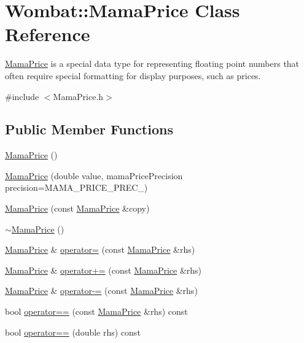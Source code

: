 \hypertarget{classWombat_1_1MamaPrice}{
\section{Wombat::MamaPrice Class Reference}
\label{classWombat_1_1MamaPrice}
}


\hyperlink{classWombat_1_1MamaPrice}{MamaPrice} is a special data type for representing floating point numbers that often require special formatting for display purposes, such as prices.  


{\ttfamily \#include $<$MamaPrice.h$>$}\subsection*{Public Member Functions}
\begin{DoxyCompactItemize}
\item 
\hyperlink{classWombat_1_1MamaPrice_ab210daeb0aac1ceee25ff8b007d6790f}{MamaPrice} ()
\item 
\hyperlink{classWombat_1_1MamaPrice_a85764a87c09a9aeca5bfacb41f834806}{MamaPrice} (double value, mamaPricePrecision precision=MAMA\_\-PRICE\_\-PREC\_)
\item 
\hyperlink{classWombat_1_1MamaPrice_ab355672c720b562a23f51405eeacfe83}{MamaPrice} (const \hyperlink{classWombat_1_1MamaPrice}{MamaPrice} \&copy)
\item 
\hyperlink{classWombat_1_1MamaPrice_a228ecc4b339282a4f0e8ddde42a7bfb1}{$\sim$MamaPrice} ()
\item 
\hyperlink{classWombat_1_1MamaPrice}{MamaPrice} \& \hyperlink{classWombat_1_1MamaPrice_ab330fbbdb0d1a636281767ef385ac08f}{operator=} (const \hyperlink{classWombat_1_1MamaPrice}{MamaPrice} \&rhs)
\item 
\hyperlink{classWombat_1_1MamaPrice}{MamaPrice} \& \hyperlink{classWombat_1_1MamaPrice_aff458c469ce08054c6d84b800386a767}{operator+=} (const \hyperlink{classWombat_1_1MamaPrice}{MamaPrice} \&rhs)
\item 
\hyperlink{classWombat_1_1MamaPrice}{MamaPrice} \& \hyperlink{classWombat_1_1MamaPrice_a8192e31ba6e1642348a1ac65367f1688}{operator-\/=} (const \hyperlink{classWombat_1_1MamaPrice}{MamaPrice} \&rhs)
\item 
bool \hyperlink{classWombat_1_1MamaPrice_a1cdef67308318e12d2f7222c26034315}{operator==} (const \hyperlink{classWombat_1_1MamaPrice}{MamaPrice} \&rhs) const 
\item 
bool \hyperlink{classWombat_1_1MamaPrice_aa5ec5a6cedaee2998ebec7e08515b27c}{operator==} (double rhs) const 

\end{DoxyCompactItemize}

